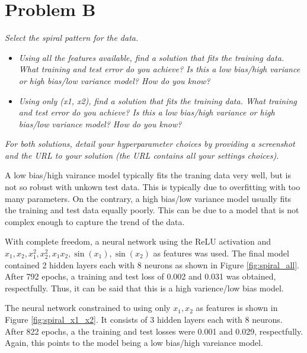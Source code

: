 \section*{Problem B}\label{sec:experimental}

\textit{Select the spiral pattern for the data.}
\begin{itemize}
    \item \textit{Using all the features available, find a solution that fits the training data. What training and test error do
    you achieve? Is this a low bias/high variance or high bias/low variance model? How do you know?}

    \item \textit{Using only (x1, x2), find a solution that fits the training data. What training and test error do you achieve?
    Is this a low bias/high variance or high bias/low variance model? How do you know?}


\end{itemize}
\textit{For both solutions, detail your hyperparameter choices by providing a screenshot and the URL to your
solution (the URL contains all your settings choices).}


A low bias/high vairance model typically fits the traning data very well, but is not so robust with unkown test data. This is typically due to overfitting with too many parameters. On the contrary, a high bias/low variance model usually fits the training and test data equally poorly. This can be due to a model that is not complex enough to capture the trend of the data. 

With complete freedom, a neural network using the ReLU activation and $x_1,x_2,x_1^2,x_2^2, x_1x_2, \sin(x_1),\sin(x_2)$ as features was used. The final model contained 2 hidden layers each with 8 neurons as shown in Figure \ref{fig:spiral_all}. After 792 epochs, a training and test loss of 0.002 and 0.031 was obtained, respectfully. Thus, it can be said that this is a high varience/low bias model.

The neural network constrained to using only $x_1,x_2$ as features is shown in Figure \ref{fig:spiral_x1_x2}. It consists of 3 hidden layers each with 8 neurons. After 822 epochs, a the training and test losses were 0.001 and 0.029, respectfully. Again, this points to the model being a low  bias/high vareiance model.

